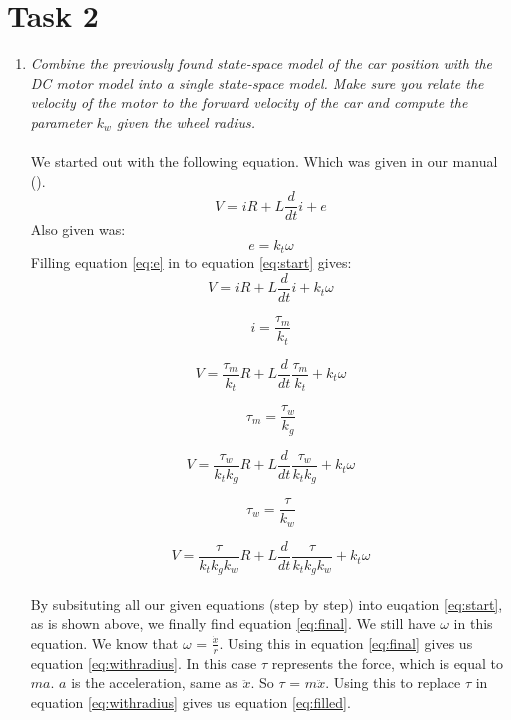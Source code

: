 \documentclass[final]{scrreprt} %
\begin{document}
\section{Task 2}
\label{sec:mod3-tsk2}
\begin{enumerate}
\item \textit{Combine the previously found state-space model of the car position with the DC motor model into a single state-space model. Make sure you relate the velocity of the motor to the forward velocity of the car and compute the parameter $k_{w}$ given the wheel radius.}\\
\\
We started out with the following equation. Which was given in our manual (\cite{epo4-manual}).
\begin{equation}
V = iR + L\frac{d}{dt}i + e
\label{eq:start}
\end{equation}
Also given was:
\begin{equation}
e = k_t \omega
\label{eq:e}
\end{equation}
Filling equation \ref{eq:e} in to equation \ref{eq:start} gives: 
\begin{equation}
V = iR + L\frac{d}{dt}i + k_t \omega
\label{eq:1}
\end{equation}

\begin{equation}
i = \frac{\tau_m}{k_t}
\label{eq:2}
\end{equation}

\begin{equation}
V = \frac{\tau_m}{k_t}R + L\frac{d}{dt}\frac{\tau_m}{k_t} +  k_t \omega
\label{eq:3}
\end{equation}

\begin{equation}
\tau_m = \frac{\tau_w}{k_g}
\label{eq:4}
\end{equation}

\begin{equation}
V = \frac{\tau_w}{k_t k_g}R + L\frac{d}{dt}\frac{\tau_w}{k_t k_g} +  k_t \omega
\label{eq:5}
\end{equation}

\begin{equation}
\tau_w = \frac{\tau}{k_w}
\label{eq:6}
\end{equation}

\begin{equation}
V = \frac{\tau}{k_t k_g k_w}R + L\frac{d}{dt}\frac{\tau}{k_t k_g k_w} +  k_t \omega
\label{eq:final}
\end{equation}\\
By subsituting all our given equations (step by step) into euqation \ref{eq:start}, as is shown above, we finally find equation \ref{eq:final}. We still have $\omega$ in this equation. We know that $\omega$ = $\frac{\dot{x}}{r}$. Using this in equation \ref{eq:final} gives us equation \ref{eq:withradius}. In this case $\tau$ represents the force, which is equal to $ma$. $a$ is the acceleration, same as $\ddot{x}$. So $\tau$ = $m\ddot{x}$. Using this to replace $\tau$ in equation \ref{eq:withradius} gives us equation \ref{eq:filled}. 


\end{enumerate}
\end{document}
